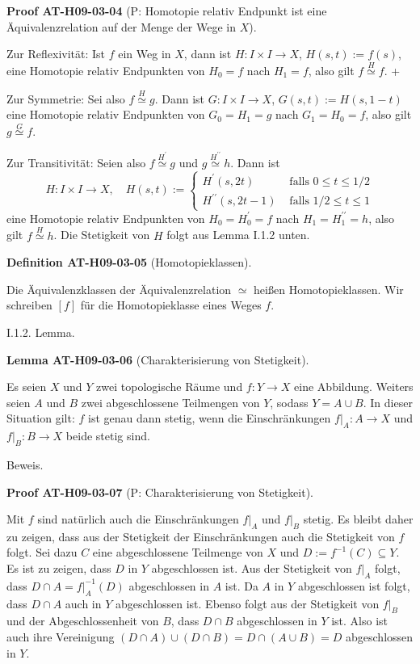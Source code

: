 \documentclass[10pt, letterpaper]{article}
\newcommand{\CustomHeading}[3]{%
  \par\medskip\noindent%
  \textbf{#1 #2} \textnormal{(#3)}.\enskip%
}
\newenvironment{DEF}[2]{\begin{unitbox}\CustomHeading{Definition}{#1}{#2}}{\end{unitbox}}
\newenvironment{LEM}[2]{\begin{unitbox}\CustomHeading{Lemma}{#1}{#2}}{\end{unitbox}}
\newenvironment{PROOF}[2]{\begin{unitbox}\CustomHeading{Proof}{#1}{#2}}{\end{unitbox}}
\begin{document}
\begin{PROOF}{AT-H09-03-04}{P: Homotopie relativ Endpunkt ist eine Äquivalenzrelation auf der Menge der Wege in $X$}
Zur Reflexivität: Ist $f$ ein Weg in $X$, dann ist $H: I \times I \rightarrow X$, $H(s, t):=f(s)$, eine Homotopie relativ Endpunkten von $H_{0}=f$ nach $H_{1}=f$, also gilt $f \stackrel{H}{\simeq} f$. +

Zur Symmetrie: Sei also $f \stackrel{H}{\simeq} g$. Dann ist $G: I \times I \rightarrow X$, $G(s, t):=H(s, 1-t)$ eine Homotopie relativ Endpunkten von $G_{0}=H_{1}=g$ nach $G_{1}=H_{0}=f$, also gilt $g \stackrel{G}{\simeq} f$. 

Zur Transitivität: Seien also $f \stackrel{H^{\prime}}{\simeq} g$ und $g \stackrel{H^{\prime \prime}}{\simeq} h$.
Dann ist
$$
H: I \times I \rightarrow X, \quad H(s, t):= \begin{cases}H^{\prime}(s, 2 t) & \text { falls } 0 \leq t \leq 1 / 2 \\ H^{\prime \prime}(s, 2 t-1) & \text { falls } 1 / 2 \leq t \leq 1\end{cases}
$$
eine Homotopie relativ Endpunkten von $H_{0}=H_{0}^{\prime}=f$ nach $H_{1}=H_{1}^{\prime \prime}=h$, also gilt $f \stackrel{H}{\simeq} h$. Die Stetigkeit von $H$ folgt aus Lemma I.1.2 unten.
\end{PROOF}

\begin{DEF}{AT-H09-03-05}{Homotopieklassen}
Die Äquivalenzklassen der Äquivalenzrelation $\simeq$ heißen Homotopieklassen. Wir schreiben $[f]$ für die Homotopieklasse eines Weges $f$.
\end{DEF}


I.1.2. Lemma. 


\begin{LEM}{AT-H09-03-06}{Charakterisierung von Stetigkeit}
Es seien $X$ und $Y$ zwei topologische Räume und $f: Y \rightarrow X$ eine Abbildung. Weiters seien $A$ und $B$ zwei abgeschlossene Teilmengen von $Y$, sodass $Y=A \cup B$. In dieser Situation gilt: $f$ ist genau dann stetig, wenn die Einschränkungen $\left.f\right|_{A}: A \rightarrow X$ und $\left.f\right|_{B}: B \rightarrow X$ beide stetig sind.
\end{LEM}

Beweis. 

\begin{PROOF}{AT-H09-03-07}{P: Charakterisierung von Stetigkeit}
Mit $f$ sind natürlich auch die Einschränkungen $\left.f\right|_{A}$ und $\left.f\right|_{B}$ stetig. Es bleibt daher zu zeigen, dass aus der Stetigkeit der Einschränkungen auch die Stetigkeit von $f$ folgt. Sei dazu $C$ eine abgeschlossene Teilmenge von $X$ und $D:=f^{-1}(C) \subseteq Y$. Es ist zu zeigen, dass $D$ in $Y$ abgeschlossen ist. Aus der Stetigkeit von $\left.f\right|_{A}$ folgt, dass $D \cap A=\left.f\right|_{A} ^{-1}(D)$ abgeschlossen in $A$ ist. Da $A$ in $Y$ abgeschlossen ist folgt, dass $D \cap A$ auch in $Y$ abgeschlossen ist. Ebenso folgt aus der Stetigkeit von $\left.f\right|_{B}$ und der Abgeschlossenheit von $B$, dass $D \cap B$ abgeschlossen in $Y$ ist. Also ist auch ihre Vereinigung $(D \cap A) \cup(D \cap B)=D \cap(A \cup B)=D$ abgeschlossen in $Y$.
\end{PROOF}
\end{document}
